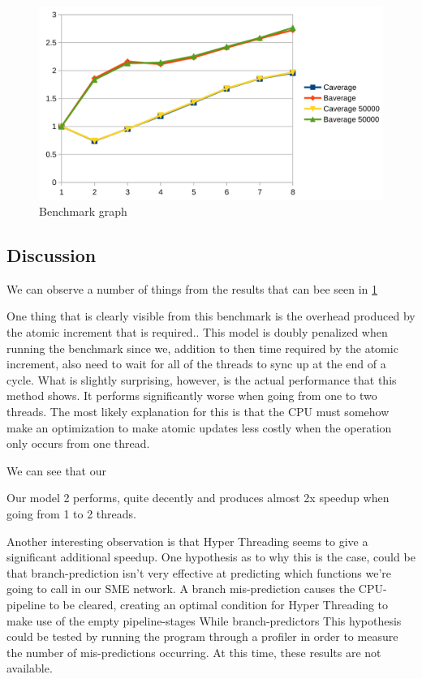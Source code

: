 \begin{figure}
\centering
\includegraphics{graphs/graphone}
\caption[Benchmark graph]{Benchmark graph}
\label{fig:graph}
\end{figure}


\subsection{Discussion}
We can observe a number of things from the results that can bee seen
in \cref{fig:graph}

One thing that is clearly visible from this benchmark is the overhead
produced by the atomic increment that is required.. This model is
doubly penalized when running the benchmark since we, addition to then
time required by the atomic increment, also need to wait for all of
the threads to sync up at the end of a cycle. What is slightly
surprising, however, is the actual performance that this method
shows. It performs significantly worse when going from one to two
threads. The most likely explanation for this is that the CPU must
somehow make an optimization to make atomic updates less costly when
the operation only occurs from one thread.

We can see that our

Our model 2 performs, quite decently and produces almost 2x speedup
when going from 1 to 2 threads.

Another interesting observation is that Hyper Threading seems to give
a significant additional speedup. One hypothesis as to why this is the
case, could be that branch-prediction isn't very effective at
predicting which functions we're going to call in our SME network. A
branch mis-prediction causes the CPU-pipeline to be cleared, creating
an optimal condition for Hyper Threading to make use of the empty
pipeline-stages\cite{fog2014microarchitecture} While branch-predictors
This hypothesis could be tested by running the program through a
profiler in order to measure the number of mis-predictions
occurring. At this time, these results are not available.


